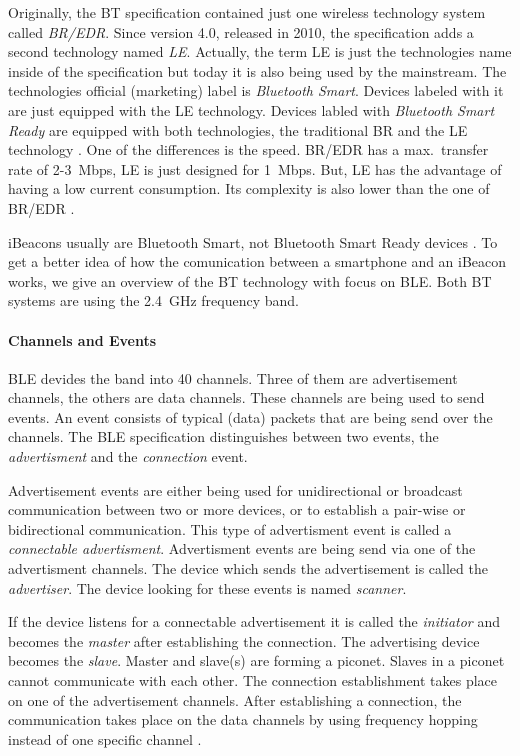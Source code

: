 Originally, the \acs{BT} specification contained just one wireless technology system called \emph{\ac{BR}/\ac{EDR}}.
Since version 4.0, released in 2010, the specification adds a second technology named \emph{\ac{LE}}.
Actually, the term \acs{LE} is just the technologies name inside of the specification but today it is also being used by the mainstream.
The technologies official (marketing) label is \emph{Bluetooth Smart}. Devices labeled with it are just equipped with the \acs{LE} technology.
Devices labled with \emph{Bluetooth Smart Ready} are equipped with both technologies, the traditional \acs{BR} and the \acs{LE} technology \cite{bluetooth:spec}.
One of the differences is the speed. \acs{BR}/\acs{EDR} has a max.\ transfer rate of 2-3~Mbps, \acs{LE} is just designed for 1~Mbps.
But, \acs{LE} has the advantage of having a low current consumption.
Its complexity is also lower than the one of \acs{BR}/\acs{EDR} \cite{bluetooth:spec}.

iBeacons usually are Bluetooth Smart, not Bluetooth Smart Ready devices \cite{binside:ds}.
To get a better idea of how the comunication between a smartphone and an iBeacon works, we give an overview of the \acs{BT} technology with focus on \acs{BLE}.
Both \acs{BT} systems are using the 2.4~GHz frequency band.


\paragraph{Channels and Events}
\acs{BLE} devides the band into 40 channels.
Three of them are advertisement channels, the others are data channels.
These channels are being used to send events.
An event consists of typical (data) packets that are being send over the channels.
The \acs{BLE} specification distinguishes between two events, the \emph{advertisment} and the \emph{connection} event.

Advertisement events are either being used for unidirectional or broadcast communication between two or more devices, or to establish a pair-wise or bidirectional communication.
This type of advertisment event is called a \emph{connectable advertisment}.
 Advertisment events are being send via one of the advertisment channels.
The device which sends the advertisement is called the \emph{advertiser}.
The device looking for these events is named \emph{scanner}.

If the device listens for a connectable advertisement it is called the \emph{initiator} and becomes the \emph{master} after establishing the connection.
The advertising device becomes the \emph{slave}.
Master and slave(s) are forming a piconet. Slaves in a piconet cannot communicate with each other.
The connection establishment takes place on one of the advertisement channels.
After establishing a connection, the communication takes place on the data channels by using frequency hopping instead of one specific channel \cite{bluetooth:spec}.

